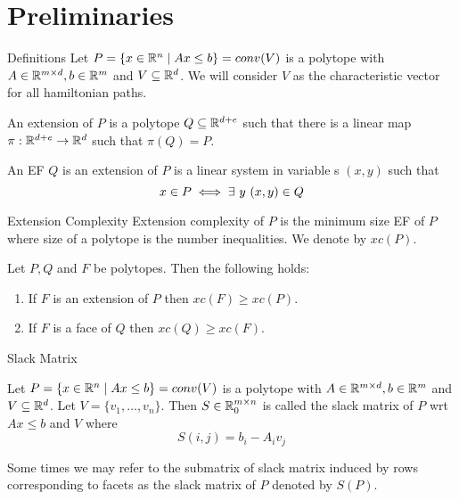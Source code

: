 \documentclass[aspectratio=1610, handout]{beamer}
\begin{document}
\section{Preliminaries}
\begin{frame}{Definitions}
	Let $P=\{x\in\mathbb{R}^n\mid Ax\leq b\}=conv(V)$ is a polytope  with $A\in\mathbb{R}^{m\times d}, b\in \mathbb{R}^m$ and $V\subseteq \mathbb{R}^d$. We will consider $V$ as the characteristic vector for all hamiltonian paths.\pause

	\begin{definition}
		An extension of $P$ is a polytope $Q\subseteq \mathbb{R}^{d+e}$ such that there is a linear map $\pi:\mathbb{R}^{d+e}\to\mathbb{R}^{d}$ such that $\pi(Q)=P$.
	\end{definition}\pause

	\begin{definition}
		An EF $Q$ is an extension of $P$ is a linear system in variable s $(x,y)$ such that $$x\in P\iff \exists\ y\ (x,y)\in Q$$\pause

	\end{definition}
\end{frame}
\begin{frame}{Extension Complexity}
	Extension complexity of $P$ is the minimum size  EF of $P$ where size of a polytope is the number inequalities. We denote by $xc(P)$.\pause\vspace*{1cm}

	\begin{lemma}
		Let $P,Q$ and $F$ be polytopes. Then the following holds:
		\begin{enumerate}[label=(\roman*)]
			\item If $F$ is an extension of $P$ then $xc(F)\geq xc(P)$.
			\item If $F$ is a face of $Q$ then $xc(Q)\geq xc(F)$.
		\end{enumerate}
	\end{lemma}
\end{frame}
\begin{frame}{Slack Matrix}
	\begin{definition}
		Let $P=\{x\in\mathbb{R}^n\mid Ax\leq b\}=conv(V)$ is a polytope  with $A\in\mathbb{R}^{m\times d}, b\in \mathbb{R}^m$ and $V\subseteq \mathbb{R}^d$. Let $V=\{v_1,\dots, v_n\}$. Then $S\in\mathbb{R}^{m\times n}_{0}$ is called the slack matrix of $P$ wrt $Ax\leq b$ and $V$ where $$S(i,j)=b_i-A_iv_j$$
	\end{definition}

	Some times we may refer to the submatrix of slack matrix induced by rows corresponding to facets as the slack matrix of $P$ denoted by $S(P)$.

\end{frame}
\end{document}
